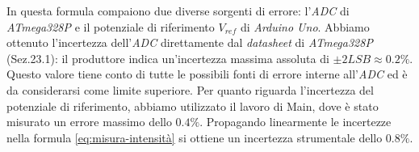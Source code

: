   In questa formula compaiono due diverse sorgenti di errore:
  l'\emph{ADC} di \emph{ATmega328P} e il potenziale di riferimento $V_{ref}$
  di \emph{Arduino Uno}.
  Abbiamo ottenuto l’incertezza dell’\emph{ADC} direttamente dal
  \emph{datasheet}\cite{atmega} di \emph{ATmega328P} (Sez.23.1):
  il produttore indica un'incertezza massima assoluta di $\pm 2LSB \approx 0.2\%$. %
  Questo valore tiene conto di tutte le possibili fonti di errore interne
  all’\emph{ADC} ed è da considerarsi come limite superiore.
  Per quanto riguarda l'incertezza del potenziale di riferimento, abbiamo
  utilizzato il lavoro di Main\cite{main}, dove è stato misurato un errore
  massimo dello $0.4\%$.
  Propagando linearmente le incertezze nella formula \eqref{eq:misura-intensità} si ottiene un incertezza
  strumentale dello $0.8\%$.

